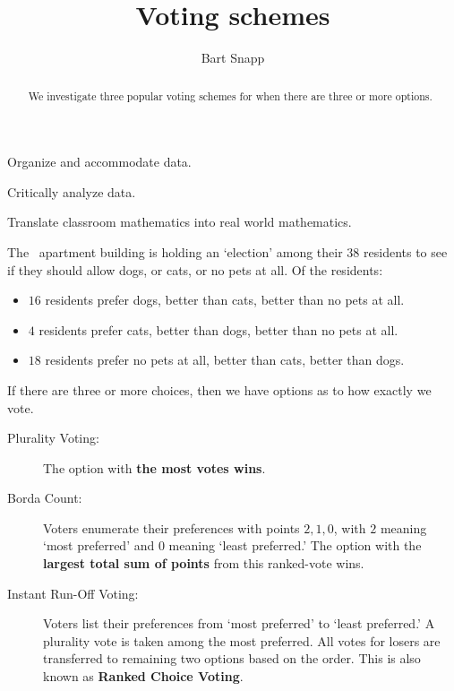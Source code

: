 \documentclass[nooutcomes,noauthor,hints,handout,12pt]{ximera}
\title{Voting schemes}
\author{Bart Snapp}
\begin{document}
\begin{abstract}
  We investigate three popular voting schemes for when there are three
  or more options.
\end{abstract}
\maketitle

\begin{listOutcomes}
\item Organize and accommodate data.
\item Critically analyze data.
\item Translate classroom mathematics into real world mathematics.
\end{listOutcomes}


The \mooculus~apartment building is holding an `election' among
their $38$ residents to see if they should allow dogs, or cats, or no
pets at all. Of the residents:
\begin{itemize}
\item $16$ residents prefer dogs, better than cats, better than no pets at all.
\item $4$ residents prefer cats, better than dogs, better than no pets at all.
\item $18$ residents prefer no pets at all, better than cats, better
  than dogs.
\end{itemize}



If there are three or more choices, then we have options as to how
exactly we vote. 
\begin{description}
\item[Plurality Voting:] The option with \textbf{the most
  votes wins}.
\item[Borda Count:] Voters enumerate their preferences with points
  $2,1,0$, with $2$ meaning `most preferred' and $0$ meaning `least
  preferred.'  The option with the \textbf{largest total sum of
    points} from this ranked-vote wins.
\item[Instant Run-Off Voting:] Voters list their preferences from
  `most preferred' to `least preferred.' A plurality vote is taken
  among the most preferred. All votes for losers are transferred to
  remaining two options based on the order. This is also known as
  \textbf{Ranked Choice Voting}.
\end{description}
\end{document}
